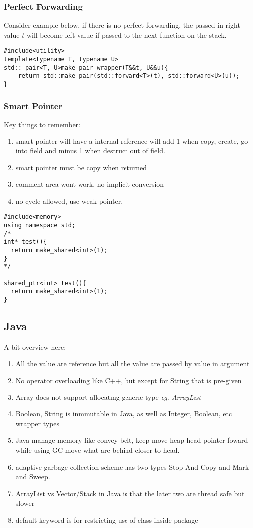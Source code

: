 \subsubsection{Perfect Forwarding}

Consider example below, if there is no perfect forwarding, the passed in right value $t$ will become left value if passed to the next function on the stack.
\begin{lstlisting}
#include<utility>
template<typename T, typename U>
std:: pair<T, U>make_pair_wrapper(T&&t, U&&u){
	return std::make_pair(std::forward<T>(t), std::forward<U>(u));
}
\end{lstlisting}
\subsubsection{Smart Pointer}
Key things to remember:
\begin{enumerate}
\item smart pointer will have a internal reference will add 1 when copy, create, go into field and minus 1 when destruct out of field.
\item smart pointer must be copy when returned
\item comment area wont work, no implicit conversion
\item no cycle allowed, use weak pointer.
\end{enumerate}

\begin{lstlisting}
#include<memory>
using namespace std;
/*
int* test(){
  return make_shared<int>(1);
}
*/

shared_ptr<int> test(){
  return make_shared<int>(1);
}
\end{lstlisting}

\subsection{Java}
A bit overview here:
\begin{enumerate}
\item All the value are reference but all the value are passed by value in argument
\item No operator overloading like C++, but {\color{red} except for String that is pre-given}
\item Array does not support allocating generic type \textit{eg. ArrayList}
\item Boolean, String is inmmutable in Java, as well as {\color{blue} Integer, Boolean, etc} wrapper types
\item Java manage memory like convey belt, keep move heap head pointer foward while using GC move what are behind closer to head.
\item {\color{blue} adaptive garbage collection scheme} has two types {\color{blue} Stop And Copy} and {\color{blue} Mark and Sweep}.
\item ArrayList vs Vector/Stack in Java is that the later two are thread safe but slower
\item {\color{blue}default} keyword is for restricting use of class inside package
\
\end{enumerate}


